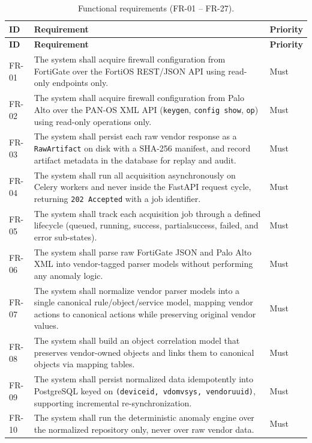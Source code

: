 \documentclass[12pt,a4paper]{report}
\renewcommand{\_}{\textunderscore\allowbreak}
\newcommand{\hrow}{}
\newcommand{\hcell}[1]{\textbf{#1}}
\newcommand{\altrow}{}
\begin{document}
\begin{longtable}{C{0.08\textwidth} L{0.70\textwidth} C{0.12\textwidth}}
\caption{Functional requirements (FR-01 -- FR-27).}\label{tab:ch3-fr}\\
\hline
\hcell{ID} & \hcell{Requirement} & \hcell{Priority} \\
\hline
\endfirsthead
\hline
\hcell{ID} & \hcell{Requirement} & \hcell{Priority} \\
\hline
\endhead
\hline
\endfoot
\hline
\endlastfoot
\hrow FR-01 & The system shall acquire firewall configuration from FortiGate over the FortiOS REST/JSON API using read-only endpoints only. & Must \\
\altrow FR-02 & The system shall acquire firewall configuration from Palo Alto over the PAN-OS XML API (\texttt{keygen}, \texttt{config show}, \texttt{op}) using read-only operations only. & Must \\
\hrow FR-03 & The system shall persist each raw vendor response as a \texttt{RawArtifact} on disk with a SHA-256 manifest, and record artifact metadata in the database for replay and audit. & Must \\
\altrow FR-04 & The system shall run all acquisition asynchronously on Celery workers and never inside the FastAPI request cycle, returning \texttt{202~Accepted} with a job identifier. & Must \\
\hrow FR-05 & The system shall track each acquisition job through a defined lifecycle (queued, running, success, partial\_success, failed, and error sub-states). & Must \\
\altrow FR-06 & The system shall parse raw FortiGate JSON and Palo Alto XML into vendor-tagged parser models without performing any anomaly logic. & Must \\
\hrow FR-07 & The system shall normalize vendor parser models into a single canonical rule/object/service model, mapping vendor actions to canonical actions while preserving original vendor values. & Must \\
\altrow FR-08 & The system shall build an object correlation model that preserves vendor-owned objects and links them to canonical objects via mapping tables. & Must \\
\hrow FR-09 & The system shall persist normalized data idempotently into PostgreSQL keyed on \texttt{(device\_id, vdom\_vsys, vendor\_uuid)}, supporting incremental re-synchronization. & Must \\
\altrow FR-10 & The system shall run the deterministic anomaly engine over the normalized repository only, never over raw vendor data. & Must \\

\end{longtable}
\end{document}
